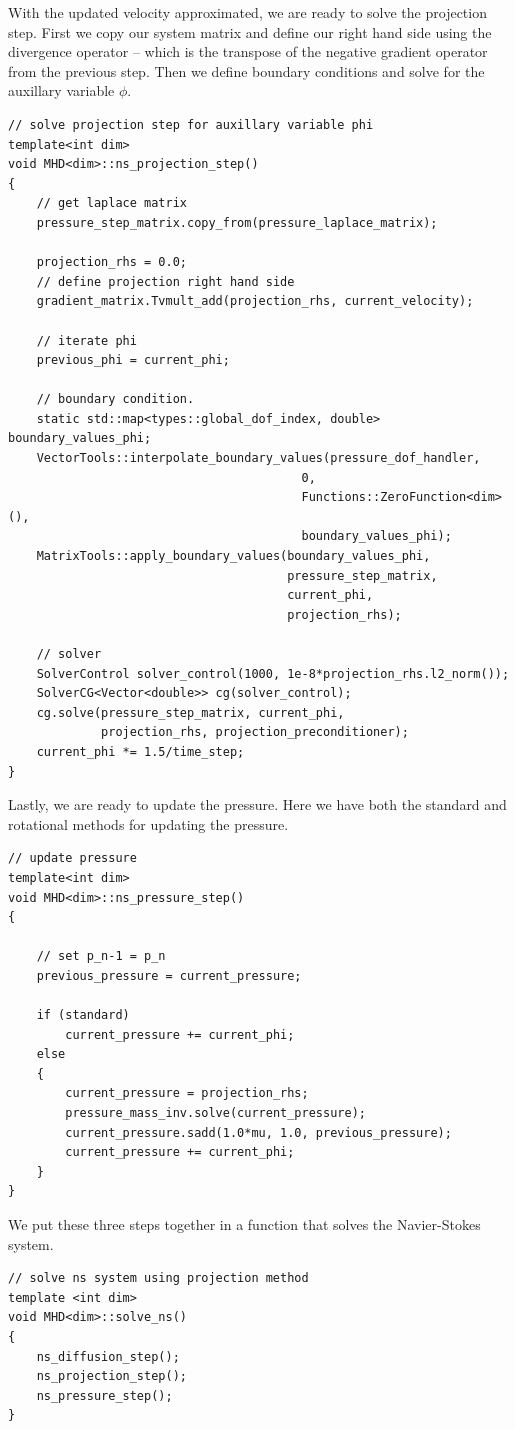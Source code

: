 \documentclass{article}
\begin{document}
With the updated velocity approximated, we are ready to solve the projection step. First we copy our system matrix and define our right hand side using the divergence operator -- which is the transpose of the negative gradient operator from the previous step. Then we define boundary conditions and solve for the auxillary variable $\phi$.
\begin{lstlisting}
// solve projection step for auxillary variable phi
template<int dim>
void MHD<dim>::ns_projection_step()
{
    // get laplace matrix
    pressure_step_matrix.copy_from(pressure_laplace_matrix);

    projection_rhs = 0.0;
    // define projection right hand side
    gradient_matrix.Tvmult_add(projection_rhs, current_velocity);

    // iterate phi
    previous_phi = current_phi;

    // boundary condition.
    static std::map<types::global_dof_index, double> boundary_values_phi;
    VectorTools::interpolate_boundary_values(pressure_dof_handler,
                                         0,
                                         Functions::ZeroFunction<dim>(),
                                         boundary_values_phi);
    MatrixTools::apply_boundary_values(boundary_values_phi,
                                       pressure_step_matrix,
                                       current_phi,
                                       projection_rhs);

    // solver
    SolverControl solver_control(1000, 1e-8*projection_rhs.l2_norm());
    SolverCG<Vector<double>> cg(solver_control);
    cg.solve(pressure_step_matrix, current_phi,
             projection_rhs, projection_preconditioner);
    current_phi *= 1.5/time_step;
}
\end{lstlisting}
Lastly, we are ready to update the pressure. Here we have both the standard and rotational methods for updating the pressure.
\begin{lstlisting}
// update pressure
template<int dim>
void MHD<dim>::ns_pressure_step()
{

    // set p_n-1 = p_n
    previous_pressure = current_pressure;

    if (standard)
        current_pressure += current_phi;
    else
    {
        current_pressure = projection_rhs;
        pressure_mass_inv.solve(current_pressure);
        current_pressure.sadd(1.0*mu, 1.0, previous_pressure);
        current_pressure += current_phi;
    }
}
\end{lstlisting}
We put these three steps together in a function that solves the Navier-Stokes system.
\begin{lstlisting}
// solve ns system using projection method
template <int dim>
void MHD<dim>::solve_ns()
{
    ns_diffusion_step();
    ns_projection_step();
    ns_pressure_step();
}
\end{lstlisting}
\end{document}
